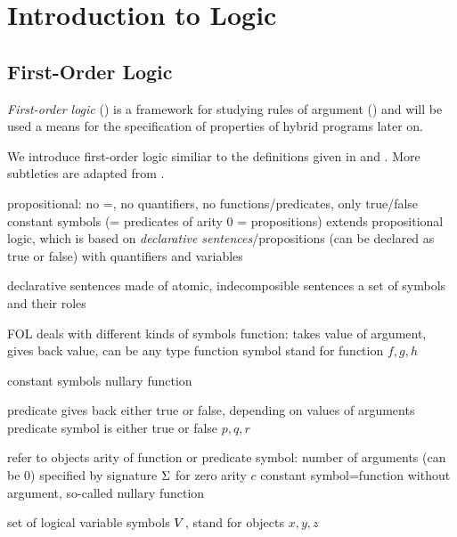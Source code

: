 \chapter{Introduction to Logic}
    \label{sec:introduction-logic}

    \section{First-Order Logic}
        \label{sec:first-order-logic}

        \textit{First-order logic} (\FOL) is a framework for studying rules of argument (\cite{hodges2001ClassicalLogic}) and will be used a means for the specification of properties of hybrid programs later on.

        We introduce first-order logic similiar to the definitions given in \cite{Platzer10HybridSystems} and \cite{Huth04LogicInCS}. More subtleties are adapted from \cite{hodges2001ClassicalLogic}.



        propositional: no =, no quantifiers, no functions/predicates, only true/false constant symbols (= predicates of arity 0 = propositions)
        extends propositional logic, which is based on \textit{declarative sentences}/propositions (can be declared as true or false) with quantifiers
        and variables

        declarative sentences made of atomic, indecomposible sentences
        a set of symbols and their roles


        FOL deals with different kinds of symbols
        function: takes value of argument, gives back value, can be any type
        function symbol stand for function
        $f,g,h$

        constant symbols nullary function

        predicate gives back either true or false, depending on values of arguments
        predicate symbol is either true or false
        $p,q,r$

        refer to objects
        arity of function or predicate symbol: number of arguments (can be 0)
        specified by signature $\Sigma$
        for zero arity $c$ constant symbol=function without argument, so-called nullary function

        set of logical variable symbols $V$, stand for objects
        $x,y,z$

